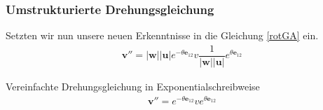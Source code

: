 \subsubsection{Umstrukturierte Drehungsgleichung}
Setzten wir nun unsere neuen Erkenntnisse in die Gleichung \eqref{rotGA} ein.
\begin{align}
	\mathbf{v''} = |\mathbf{w}||\mathbf{u}|e^{-\theta \mathbf{e}_{12}} v \dfrac{1}{|\mathbf{w}||\mathbf{u}|}e^{\theta \mathbf{e}_{12}}
\end{align}
\begin{satz}
	Vereinfachte Drehungsgleichung in Exponentialschreibweise
	\begin{align}
		\mathbf{v''} = e^{-\theta \mathbf{e}_{12}} v e^{\theta \mathbf{e}_{12}}
	\end{align}
\end{satz}


